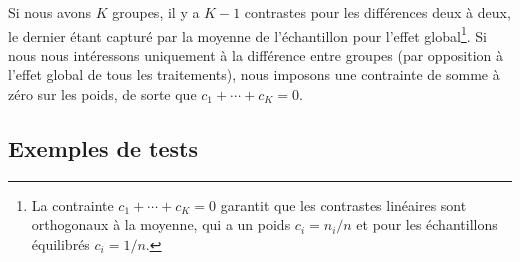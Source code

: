 \documentclass[
  11pt,
  letterpaper,
]{scrbook}
\theoremstyle{definition}
\theoremstyle{definition}
\theoremstyle{plain}
\theoremstyle{plain}
\theoremstyle{remark}
\begin{document}
Si nous avons \(K\) groupes, il y a \(K-1\) contrastes pour les
différences deux à deux, le dernier étant capturé par la moyenne de
l'échantillon pour l'effet global\footnote{La contrainte
  \(c_1 + \cdots + c_K=0\) garantit que les contrastes linéaires sont
  orthogonaux à la moyenne, qui a un poids \(c_i=n_i/n\) et pour les
  échantillons équilibrés \(c_i =1/n\).}. Si nous nous intéressons
uniquement à la différence entre groupes (par opposition à l'effet
global de tous les traitements), nous imposons une contrainte de somme à
zéro sur les poids, de sorte que \(c_1 + \cdots + c_K=0\).

\subsection{Exemples de tests}\label{exemples-de-tests}
\end{document}
